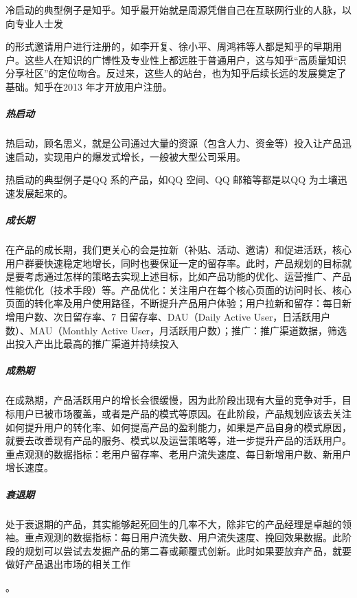 \documentclass[letterpaper,10pt,english]{sphinxmanual}
\begin{document}
冷启动的典型例子是知乎。知乎最开始就是周源凭借自己在互联网行业的人脉，以向专业人士发%
\begin{footnote}[115]\sphinxAtStartFootnote
{}
%
\end{footnote}的形式邀请用户进行注册的，如李开复、徐小平、周鸿祎等人都是知乎的早期用户。这些人在知识的广博性及专业性上都远胜于普通用户，这与知乎“高质量知识分享社区”的定位吻合。反过来，这些人的站台，也为知乎后续长远的发展奠定了基础。知乎在2013
年才开放用户注册。


\subparagraph{热启动}
\label{\detokenize{chapter_introduction/2C:id16}}
热启动，顾名思义，就是公司通过大量的资源（包含人力、资金等）投入让产品迅速启动，实现用户的爆发式增长，一般被大型公司采用。

热启动的典型例子是QQ 系的产品，如QQ 空间、QQ 邮箱等都是以QQ
为土壤迅速发展起来的。%
\begin{footnote}[116]\sphinxAtStartFootnote
{}
%
\end{footnote}


\subparagraph{成长期}
\label{\detokenize{chapter_introduction/2C:id17}}
在产品的成长期，我们更关心的会是拉新（补贴、活动、邀请）和促进活跃，核心用户群要快速稳定地增长，同时也要保证一定的留存率。此时，产品规划的目标就是要考虑通过怎样的策略去实现上述目标，比如产品功能的优化、运营推广、产品性能优化（技术手段）等。产品优化：关注用户在每个核心页面的访问时长、核心页面的转化率及用户使用路径，不断提升产品用户体验；用户拉新和留存：每日新增用户数、次日留存率、7
日留存率、DAU（Daily Active User，日活跃用户数）、MAU（Monthly Active
User，月活跃用户数）；推广：推广渠道数据，筛选出投入产出比最高的推广渠道并持续投入


\subparagraph{成熟期}
\label{\detokenize{chapter_introduction/2C:id18}}
在成熟期，产品活跃用户的增长会很缓慢，因为此阶段出现有大量的竞争对手，目标用户已被市场覆盖，或者是产品的模式等原因。在此阶段，产品规划应该去关注如何提升用户的转化率、如何提高产品的盈利能力，如果是产品自身的模式原因，就要去改善现有产品的服务、模式以及运营策略等，进一步提升产品的活跃用户。重点观测的数据指标：老用户留存率、老用户流失速度、每日新增用户数、新用户增长速度。


\subparagraph{衰退期}
\label{\detokenize{chapter_introduction/2C:id19}}
处于衰退期的产品，其实能够起死回生的几率不大，除非它的产品经理是卓越的领袖。重点观测的数据指标：每日用户流失数、用户流失速度、挽回效果数据。此阶段的规划可以尝试去发掘产品的第二春或颠覆式创新。此时如果要放弃产品，就要做好产品退出市场的相关工作
%
\begin{footnote}[117]\sphinxAtStartFootnote
{}
%
\end{footnote}。
\end{document}
